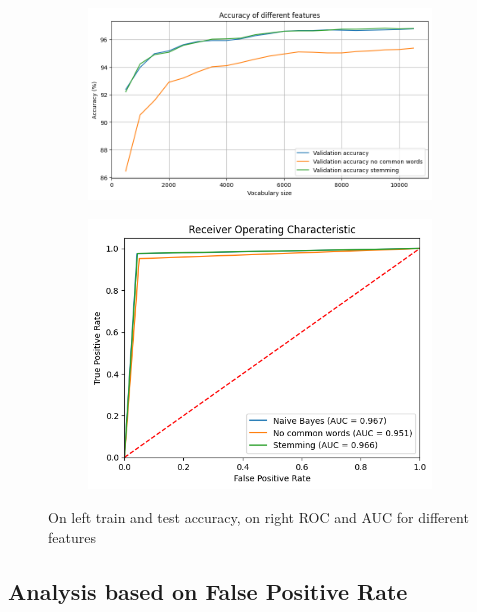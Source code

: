 \documentclass{class}
\begin{document}
\begin{figure}[h]
    \begin{subfigure}{.5\linewidth}
        \includegraphics[width=\linewidth]{images/naive_features_sel.png}
    \end{subfigure}%
    \begin{subfigure}{.5\linewidth}
        \includegraphics[width=\linewidth]{images/naive_features_sel_ROC.png}
    \end{subfigure}
    \caption{On left train and test accuracy, on right ROC and AUC for different features}
    \label{fig-2}
\end{figure}
\subsection{Analysis based on False Positive Rate}
\end{document}
